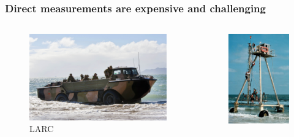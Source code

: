 \documentclass[7pt]{beamer}
\begin{document}
\begin{frame}
    \frametitle{Direct measurements are expensive and challenging}
    \begin{columns}  
            \centering
            \begin{figure}[h!]
                \includegraphics[width=1\linewidth]{img/LARC2.jpg}\hfill
                \centering
                \captionsetup{labelformat=empty}
                \caption{LARC}
            \end{figure}        
            \begin{figure}[h]
                \includegraphics[width=0.8\linewidth]{img/CRAB3.JPG}

\end{figure}
\end{columns}
\end{frame}
\end{document}
